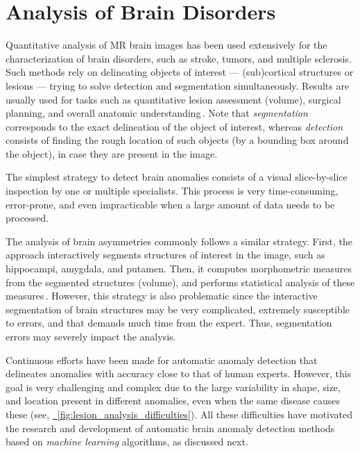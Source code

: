\section{Analysis of Brain Disorders}
\label{sec:analysis_of_brain_diseases}
Quantitative analysis of MR brain images has been used extensively for the characterization of brain disorders, such as stroke, tumors, and multiple sclerosis. Such methods rely on delineating objects of interest --- (sub)cortical structures or lesions --- trying to solve detection and segmentation simultaneously. Results are usually used for tasks such as quantitative lesion assessment (\eg volume), surgical planning, and overall anatomic understanding\,\cite{Kamnitsas-2017-MEDIA,Chen-2018-NEURO-VoxResNet,Soltaninejad-2017-AutomatedBrainSuperpixel}. Note that \emph{segmentation} corresponds to the exact delineation of the object of interest, whereas \emph{detection} consists of finding the rough location of such objects (\eg by a bounding box around the object), in case they are present in the image.

The simplest strategy to detect brain anomalies consists of a visual slice-by-slice inspection by one or multiple specialists. This process is very time-consuming, error-prone, and even impracticable when a large amount of data needs to be processed. 

The analysis of brain asymmetries commonly follows a similar strategy. First, the approach interactively segments structures of interest in the image, such as hippocampi, amygdala, and putamen. Then, it computes morphometric measures from the segmented structures (\eg volume), and performs statistical analysis of these measures\,\cite{Herbert-2004-BrainAsymmetries}. However, this strategy is also problematic since the interactive segmentation of brain structures may be very complicated, extremely susceptible to errors, and that demands much time from the expert. Thus, segmentation errors may severely impact the analysis.

Continuous efforts have been made for automatic anomaly detection that delineates anomalies with accuracy close to that of human experts. However, this goal is very challenging and complex due to the large variability in shape, size, and location present in different anomalies, even when the same disease causes these (see, \eg \hyperref[fig:lesion_analysis_difficulties]{\fig~\ref{fig:lesion_analysis_difficulties}}). All these difficulties have motivated the research and development of automatic brain anomaly detection methods based on \emph{machine learning} algorithms, as discussed next.

